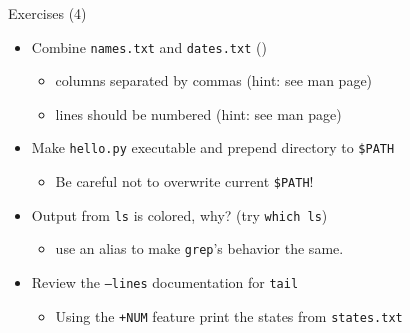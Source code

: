 \documentclass[hyperref={pdfpagelabels=false},12pt]{beamer}
\newcommand{\mybutton}[2]{\hyperlink{#1}{\beamerbutton{{#2}}}}
\begin{document}
\begin{frame}[label=exercises-4]{Exercises (4)}
    \begin{itemize}
        \item Combine \texttt{names.txt} and \texttt{dates.txt} (\mybutton{cut-and-paste}{hint})
        \begin{itemize}
            \item columns separated by commas (hint: see man page)
            \item lines should be numbered (hint: see man page)
        \end{itemize}
        \item Make \texttt{hello.py} executable and prepend directory to \texttt{\$PATH}
        \begin{itemize}
            \item Be careful not to overwrite current \texttt{\$PATH}!
        \end{itemize}
        \item Output from \texttt{ls} is colored, why? (try \texttt{which ls})
        \begin{itemize}
            \item use an alias to make \texttt{grep}'s behavior the same.
        \end{itemize}
        \item Review the \texttt{--lines} documentation for \texttt{tail}
        \begin{itemize}
            \item Using the \texttt{+NUM} feature print the states from \texttt{states.txt}
        \end{itemize}
    \end{itemize}
\end{frame}
\end{document}
